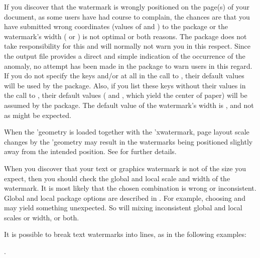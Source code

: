 \documentclass[
  use-a4-paper,
  use-10pt-font,
  final-version,
  use-UK-English,
  fancy-section-headings,
  frame-section-numbers,
  para-abstract-style,
  input-config-file,
  no-hyperref-messages,
  option-stack-limit=4,
  inputfile=true,
]{amltxdoc}
\begin{document}
If you discover that the watermark is wrongly positioned on the page(s) of your document, as some users have had course to complain, the chances are that you have submitted wrong coordinates (values of  and ) to the package or the watermark's width ( or ) is not optimal or both reasons. The package does not take responsibility for this and will normally not warn you in this respect. Since the output file provides a direct and simple indication of the occurrence of the anomaly, no attempt has been made in the package to warn users in this regard. If you do not specify the keys  and/or  at all in the call to  \fx{\newwatermark}, their default values will be used by the package. Also, if you list these keys without their values in the call to \fx{\newwatermark}, their default values ( and , which yield the center of paper) will be assumed by the package. The default value of the watermark's width is \hx{\paperheight}, and not \hx{\paperwidth} as might be expected.

When the \pkg'{geometry} is loaded together with the \pkg'{xwatermark}, page layout scale changes by the \pkg'{geometry} may result in the watermarks being positioned slightly away from the intended position. See  for further details.



When you discover that your text or graphics watermark is not of the size you expect, then you should check the global and local scale and width of the watermark. It is most likely that the chosen combination is wrong or inconsistent. Global and local package options are described in . For example, choosing  and  may yield something unexpected. So will mixing inconsistent global and local scales or width, or both.



It is possible to break text watermarks into lines, as in the following examples:


.
\end{document}
